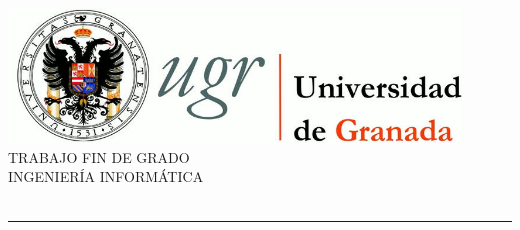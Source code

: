 
\thispagestyle{empty}

\begin{titlepage}
 
 
\newlength{\centeroffset}
\setlength{\centeroffset}{-0.5\oddsidemargin}
\addtolength{\centeroffset}{0.5\evensidemargin}
\thispagestyle{empty}

\noindent\hspace*{\centeroffset}\begin{minipage}{\textwidth}

\centering
\includegraphics[width=0.9\textwidth]{01.Estructura/02.Portada/00.Figuras/01.logo_ugr.jpg}\\[1.4cm]

\textsc{ \Large TRABAJO FIN DE GRADO\\[0.2cm]}
\textsc{ INGENIERÍA INFORMÁTICA}\\[1cm]
% 
{\Huge\bfseries \tfgtitlename\\
}
\noindent\rule[-1ex]{\textwidth}{3pt}\\[3.5ex]
{\large\bfseries \tfgsubtitlename}
\end{minipage}

\vspace{2cm}
\noindent\hspace*{\centeroffset}\begin{minipage}{\textwidth}
\centering




\end{minipage}
\end{titlepage}
